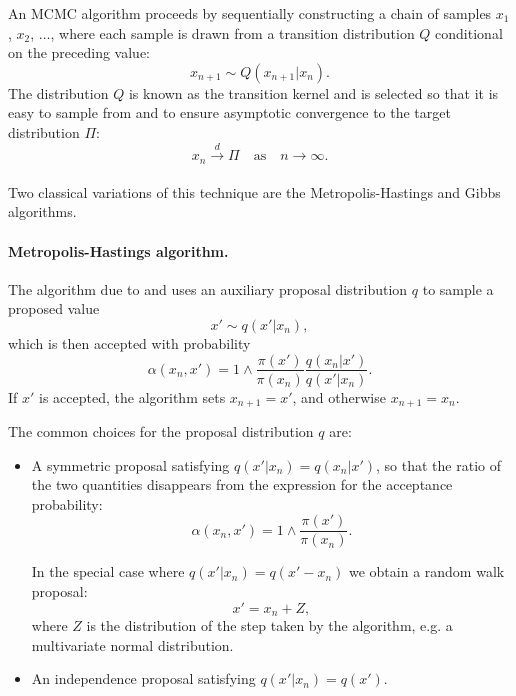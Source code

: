 \documentclass[12pt,a4paper]{report}
\begin{document}


An MCMC algorithm proceeds by sequentially constructing a chain of samples $x_1$, $x_2$, $\dots$,  where each sample is drawn from a transition distribution $Q$ conditional on the preceding value:
$$x_{n+1} \sim Q(x_{n+1}|x_n).$$
The distribution $Q$ is known as the transition kernel and is selected so that it is easy to sample from and to ensure asymptotic convergence to the target distribution $\Pi$:
$$x_n \xrightarrow[]{d} \Pi \quad\text{as}\quad n \to \infty.$$

Two classical variations of this technique are the Metropolis-Hastings and Gibbs algorithms.

\paragraph{Metropolis-Hastings algorithm.} The algorithm due to \cite{metropolis_equation_1953} and \cite{hastings_monte_1970} uses an auxiliary proposal distribution $q$ to sample a proposed value
$$x' \sim q(x' | x_n),$$
which is then accepted with probability
$$\alpha(x_n, x') = 1 \wedge \frac{\pi(x')}{\pi(x_n)} \frac{q(x_n|x')}{q(x'|x_n)}.$$
If $x'$ is accepted, the algorithm sets $x_{n+1} = x'$, and otherwise $x_{n+1} = x_n$.


The common choices for the proposal distribution $q$ are:
\begin{itemize}
\item A symmetric proposal satisfying $q(x'|x_n) = q(x_n|x')$, so that the ratio of the two quantities disappears from the expression for the acceptance probability:
$$\alpha(x_n, x') = 1 \wedge \frac{\pi(x')}{\pi(x_n)}.$$

In the special case where $q(x'|x_n) = q(x' - x_n)$ we obtain a random walk proposal:
$$x' = x_n + Z,$$
where $Z$ is the distribution of the step taken by the algorithm, e.g. a multivariate normal distribution.

\item An independence proposal satisfying $q(x'|x_n) = q(x')$.

\end{itemize}
\end{document}

